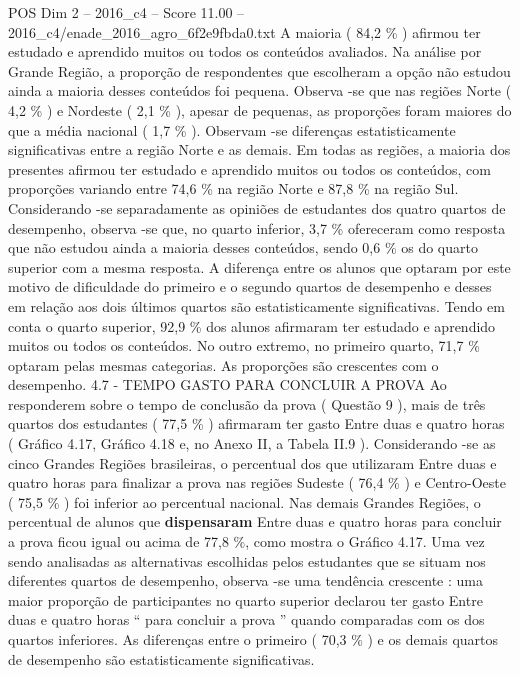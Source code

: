 \begin{textsample}{POS Dim 2 – 2016\_c4 – Score 11.00 – 2016\_c4/enade\_2016\_agro\_6f2e9fbda0.txt}
A maioria ( 84,2 \% ) afirmou ter estudado e aprendido muitos ou todos os conteúdos avaliados.
Na análise por Grande Região, a proporção de respondentes que escolheram a opção não estudou ainda a maioria desses conteúdos foi pequena.
Observa -se que nas regiões Norte ( 4,2 \% ) e Nordeste ( 2,1 \% ), apesar de pequenas, as proporções foram maiores do que a média nacional ( 1,7 \% ).
Observam -se diferenças estatisticamente significativas entre a região Norte e as demais.
Em todas as regiões, a maioria dos presentes afirmou ter estudado e aprendido muitos ou todos os conteúdos, com proporções variando entre 74,6 \% na região Norte e 87,8 \% na região Sul.
Considerando -se separadamente as opiniões de estudantes dos quatro quartos de desempenho, observa -se que, no quarto inferior, 3,7 \% ofereceram como resposta que não estudou ainda a maioria desses conteúdos, sendo 0,6 \% os do quarto superior com a mesma resposta.
A diferença entre os alunos que optaram por este motivo de dificuldade do primeiro e o segundo quartos de desempenho e desses em relação aos dois últimos quartos são estatisticamente significativas.
Tendo em conta o quarto superior, 92,9 \% dos alunos afirmaram ter estudado e aprendido muitos ou todos os conteúdos.
No outro extremo, no primeiro quarto, 71,7 \% optaram pelas mesmas categorias.
As proporções são crescentes com o desempenho. 4.7 - TEMPO GASTO PARA CONCLUIR A PROVA Ao responderem sobre o tempo de conclusão da prova ( Questão 9 ), mais de três quartos dos estudantes ( 77,5 \% ) afirmaram ter gasto Entre duas e quatro horas ( Gráfico 4.17, Gráfico 4.18 e, no Anexo II, a Tabela II.9 ).
Considerando -se as cinco Grandes Regiões brasileiras, o percentual dos que utilizaram Entre duas e quatro horas para finalizar a prova nas regiões Sudeste ( 76,4 \% ) e Centro-Oeste ( 75,5 \% ) foi inferior ao percentual nacional.
Nas demais Grandes Regiões, o percentual de alunos que \textbf{dispensaram} Entre duas e quatro horas para concluir a prova ficou igual ou acima de 77,8 \%, como mostra o Gráfico 4.17.
Uma vez sendo analisadas as alternativas escolhidas pelos estudantes que se situam nos diferentes quartos de desempenho, observa -se uma tendência crescente : uma maior proporção de participantes no quarto superior declarou ter gasto Entre duas e quatro horas “ para concluir a prova ” quando comparadas com os dos quartos inferiores.
As diferenças entre o primeiro ( 70,3 \% ) e os demais quartos de desempenho são estatisticamente significativas.

\end{textsample}
